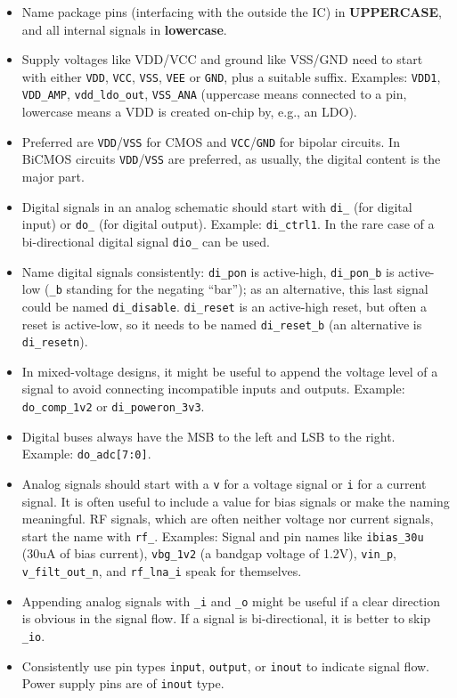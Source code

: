 \documentclass[
  a4paper,
  DIV=11,
  numbers=noendperiod]{scrartcl}
\providecommand{\tightlist}{%
  \setlength{\itemsep}{0pt}\setlength{\parskip}{0pt}}\usepackage{longtable,booktabs,array}
\begin{document}
\begin{itemize}
\tightlist
\item
  Name package pins (interfacing with the outside the IC) in
  \textbf{UPPERCASE}, and all internal signals in \textbf{lowercase}.
\item
  Supply voltages like VDD/VCC and ground like VSS/GND need to start
  with either \texttt{VDD}, \texttt{VCC}, \texttt{VSS}, \texttt{VEE} or
  \texttt{GND}, plus a suitable suffix. Examples: \texttt{VDD1},
  \texttt{VDD\_AMP}, \texttt{vdd\_ldo\_out}, \texttt{VSS\_ANA}
  (uppercase means connected to a pin, lowercase means a VDD is created
  on-chip by, e.g., an LDO).
\item
  Preferred are \texttt{VDD}/\texttt{VSS} for CMOS and
  \texttt{VCC}/\texttt{GND} for bipolar circuits. In BiCMOS circuits
  \texttt{VDD}/\texttt{VSS} are preferred, as usually, the digital
  content is the major part.
\item
  Digital signals in an analog schematic should start with \texttt{di\_}
  (for digital input) or \texttt{do\_} (for digital output). Example:
  \texttt{di\_ctrl1}. In the rare case of a bi-directional digital
  signal \texttt{dio\_} can be used.
\item
  Name digital signals consistently: \texttt{di\_pon} is active-high,
  \texttt{di\_pon\_b} is active-low (\texttt{\_b} standing for the
  negating ``bar''); as an alternative, this last signal could be named
  \texttt{di\_disable}. \texttt{di\_reset} is an active-high reset, but
  often a reset is active-low, so it needs to be named
  \texttt{di\_reset\_b} (an alternative is \texttt{di\_resetn}).
\item
  In mixed-voltage designs, it might be useful to append the voltage
  level of a signal to avoid connecting incompatible inputs and outputs.
  Example: \texttt{do\_comp\_1v2} or \texttt{di\_poweron\_3v3}.
\item
  Digital buses always have the MSB to the left and LSB to the right.
  Example: \texttt{do\_adc{[}7:0{]}}.
\item
  Analog signals should start with a \texttt{v} for a voltage signal or
  \texttt{i} for a current signal. It is often useful to include a value
  for bias signals or make the naming meaningful. RF signals, which are
  often neither voltage nor current signals, start the name with
  \texttt{rf\_}. Examples: Signal and pin names like \texttt{ibias\_30u}
  (30uA of bias current), \texttt{vbg\_1v2} (a bandgap voltage of 1.2V),
  \texttt{vin\_p}, \texttt{v\_filt\_out\_n}, and \texttt{rf\_lna\_i}
  speak for themselves.
\item
  Appending analog signals with \texttt{\_i} and \texttt{\_o} might be
  useful if a clear direction is obvious in the signal flow. If a signal
  is bi-directional, it is better to skip \texttt{\_io}.
\item
  Consistently use pin types \texttt{input}, \texttt{output}, or
  \texttt{inout} to indicate signal flow. Power supply pins are of
  \texttt{inout} type.
\end{itemize}
\end{document}
